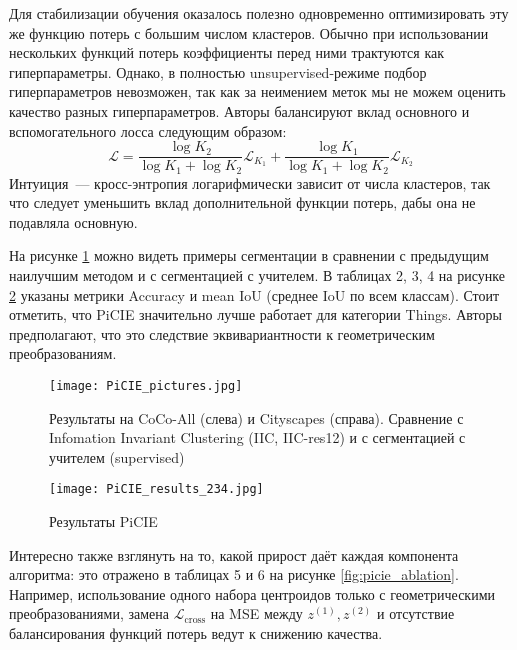     Для стабилизации обучения оказалось полезно одновременно оптимизировать эту же функцию потерь с большим числом кластеров.
    Обычно при использовании нескольких функций потерь коэффициенты перед ними трактуются как гиперпараметры.
    Однако, в полностью unsupervised-режиме подбор гиперпараметров невозможен, так как за неимением меток мы не можем оценить качество разных гиперпараметров.
    Авторы балансируют вклад основного и вспомогательного лосса следующим образом:
    \begin{equation}
        \mathcal{L} = \frac{\log K_2}{\log K_1 + \log K_2} \mathcal{L}_{K_1} + \frac{\log K_1}{\log K_1 + \log K_2} \mathcal{L}_{K_2} 
    \end{equation}
    Интуиция~--- кросс-энтропия логарифмически зависит от числа кластеров, 
    так что следует уменьшить вклад дополнительной функции потерь, дабы она не подавляла основную.

    На рисунке \ref{fig:picie_pictures} можно видеть примеры сегментации в сравнении с предыдущим наилучшим методом
    и с сегментацией с учителем. В таблицах 2, 3, 4 на рисунке \ref{fig:picie_results} указаны метрики Accuracy и mean IoU (среднее IoU по всем классам).
    Стоит отметить, что PiCIE значительно лучше работает для категории Things.
    Авторы предполагают, что это следствие эквивариантности к геометрическим преобразованиям.

    \begin{figure}
        \centering
        \texttt{[image: PiCIE\_pictures.jpg]}
        \caption{Результаты на CoCo-All (слева) и Cityscapes (справа). 
        Сравнение с Infomation Invariant Clustering (IIC, IIC-res12) 
        и с сегментацией с учителем (supervised) \label{fig:picie_pictures}}
    \end{figure}

    \begin{figure}
        \centering
        \texttt{[image: PiCIE\_results\_234.jpg]}
        \caption{Результаты PiCIE \label{fig:picie_results}}
    \end{figure}

    Интересно также взглянуть на то, какой прирост даёт каждая компонента алгоритма: это отражено в таблицах 5 и 6 на рисунке \ref{fig:picie_ablation}.
    Например, использование одного набора центроидов только с геометрическими преобразованиями, 
    замена $\mathcal{L}_\text{cross}$ на MSE между $z^{(1)}, z^{(2)}$ и отсутствие балансирования функций потерь ведут к снижению качества.

